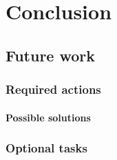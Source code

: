 \chapter{Conclusion}
\label{chp:conclusion} 

\section{Future work}
\label{sec:futurework} 


\subsection{Required actions}

\subsubsection{Possible solutions}

\subsection{Optional tasks}

